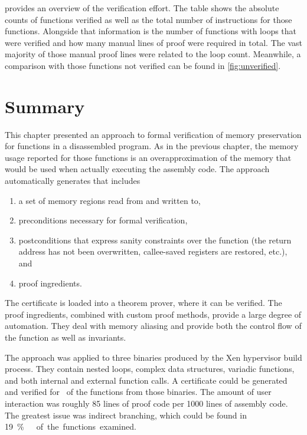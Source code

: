  provides an overview of the verification effort.
The table shows the absolute counts of functions verified
as well as the total number of instructions for those functions.
Alongside that information is the number of functions with loops
that were verified and how many manual lines of proof were required in total.
The vast majority of those manual proof lines were related to the loop count.
Meanwhile, a comparison with those functions not verified
can be found in \cref{fig:unverified}.

\section{Summary}
This chapter presented an approach to formal verification of memory preservation
for functions in a disassembled program. As in the previous chapter,
the memory usage reported for those functions is an overapproximation
of the memory that would be used when actually executing the assembly code.
The approach automatically generates  that includes
\begin{enumerate}
  \item a set of memory regions read from and written to,
  \item preconditions necessary for formal verification,
  \item postconditions that express sanity constraints over the function
  (the return address has not been overwritten,
  callee-saved registers are restored, etc.), and
  \item proof ingredients.
\end{enumerate}
The certificate is loaded into a theorem prover, where it can be verified.
The proof ingredients, combined with custom proof methods,
provide a large degree of automation.
They deal with memory aliasing and provide both the control flow of the function
as well as invariants.

The approach was applied to three binaries produced by the Xen hypervisor build process.
They contain nested loops, complex data structures, variadic functions,
and both internal and external function calls.
A certificate could be generated and verified
for \xenpercentage\ of the functions from those binaries.
The amount of user interaction was roughly \num{85} lines of proof code
per \num{1000} lines of assembly code.
The greatest issue was indirect branching,
which could be found in \SI{19}\percent\ of the functions examined.
